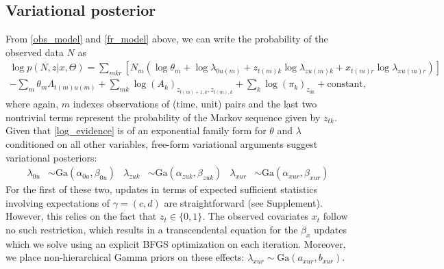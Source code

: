\documentclass{article} %
\begin{document}
\subsection{Variational posterior}
From \ref{obs_model} and \ref{fr_model} above, we can write the probability of the observed data $N$ as
\begin{multline}
    \label{log_evidence}
    \log p(N, z|x, \Theta) = \sum_{mkr} \left[ 
        N_m \left( \log \theta_m +
            \log \lambda_{0u(m)} +
            z_{t(m) k} \log \lambda_{zu(m) k} + 
            x_{t(m) r} \log \lambda_{xu(m) r}
            \right)
    \right] \\
    - \sum_m \theta_m \Lambda_{t(m) u(m)} + 
    \sum_{mk} \log (A_k)_{z_{t(m)+1, k}, z_{t(m), k}} + 
    \sum_k \log (\pi_k)_{z_{0k}} + \text{constant,}
\end{multline}
where again, $m$ indexes observations of (time, unit) pairs and the last two nontrivial terms represent the probability of the Markov sequence given by $z_{tk}$. Given that \ref{log_evidence} is of an exponential family form for $\theta$ and $\lambda$ conditioned on all other variables, free-form variational arguments \cite{Wainwright2008-ii} suggest variational posteriors:
\begin{align}
    \lambda_{0u} &\sim \text{Ga}(\alpha_{0u}, \beta_{0u}) &
    \lambda_{zuk} &\sim \text{Ga}(\alpha_{zuk}, \beta_{zuk}) &
    \lambda_{xur} &\sim \text{Ga}(\alpha_{xur}, \beta_{xur})
\end{align}
For the first of these two, updates in terms of expected sufficient statistics involving expectations of $\gamma = (c, d)$ are straightforward (see Supplement). However, this relies on the fact that $z_t \in \lbrace0, 1\rbrace$. The observed covariates $x_t$ follow no such restriction, which results in a transcendental equation for the $\beta_x$ updates which we solve using an explicit BFGS optimization on each iteration. Moreover, we place non-hierarchical Gamma priors on these effects: $\lambda_{xur} \sim \text{Ga}(a_{xur}, b_{xur})$.
\end{document}
